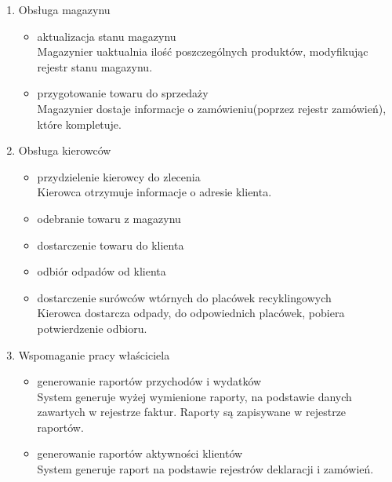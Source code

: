 \begin{enumerate}
	\item Obsługa magazynu
		\begin{itemize}
			\item aktualizacja stanu magazynu \\
		 	Magazynier uaktualnia ilość poszczególnych produktów, modyfikując rejestr stanu magazynu.
		 	\item przygotowanie towaru do sprzedaży \\
		 	Magazynier dostaje informacje o zamówieniu(poprzez rejestr zamówień), które kompletuje.
		\end{itemize}

	\item Obsługa kierowców 
		\begin{itemize}
			\item przydzielenie kierowcy do zlecenia \\
			Kierowca otrzymuje informacje o adresie klienta.
			\item odebranie towaru z magazynu 
			\item dostarczenie towaru do klienta
			\item odbiór odpadów od klienta
			\item dostarczenie surówców wtórnych do placówek recyklingowych \\
			Kierowca dostarcza odpady, do odpowiednich placówek, pobiera potwierdzenie odbioru.
		\end{itemize}

	\item Wspomaganie pracy właściciela
		\begin{itemize}
			\item generowanie raportów przychodów i wydatków\\
			System generuje wyżej wymienione raporty, na podstawie danych zawartych w rejestrze faktur. Raporty są zapisywane w rejestrze raportów.
			\item generowanie raportów aktywności klientów \\
			System generuje raport na podstawie rejestrów deklaracji i zamówień.
		\end{itemize}

\end{enumerate}